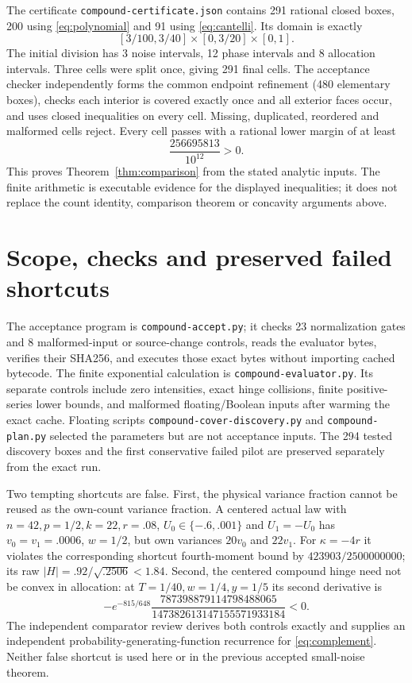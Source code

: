 \documentclass[11pt,a4paper]{article}
\begin{document}
The certificate \texttt{compound-certificate.json} contains 291 rational
closed boxes, 200 using \eqref{eq:polynomial} and 91 using
\eqref{eq:cantelli}. Its domain is exactly
\[
 [3/100,3/40]\times[0,3/20]\times[0,1].
\]
The initial division has 3 noise intervals, 12 phase intervals and
8 allocation intervals. Three cells were split once, giving 291 final
cells. The acceptance checker independently forms the common endpoint
refinement (480 elementary boxes), checks each interior is covered exactly
once and all exterior faces occur, and uses closed inequalities on every
cell. Missing, duplicated, reordered and malformed cells reject.
Every cell passes with a rational lower margin of at least
\[
                    \frac{256695813}{10^{12}}>0.
\]
This proves Theorem~\ref{thm:comparison} from the stated analytic inputs.
The finite arithmetic is executable evidence for the displayed inequalities;
it does not replace the count identity, comparison theorem or concavity
arguments above.

\section{Scope, checks and preserved failed shortcuts}
The acceptance program is \texttt{compound-accept.py}; it checks 23
normalization gates and 8 malformed-input or source-change controls, reads
the evaluator bytes, verifies their SHA256, and executes those exact bytes
without importing cached bytecode. The finite exponential calculation is
\texttt{compound-evaluator.py}. Its separate controls include zero
intensities, exact hinge collisions, finite positive-series lower bounds,
and malformed floating/Boolean inputs after warming the exact cache.
Floating scripts \texttt{compound-cover-discovery.py} and
\texttt{compound-plan.py} selected the parameters but are not acceptance
inputs. The 294 tested discovery boxes and the first conservative failed
pilot are preserved separately from the exact run.

Two tempting shortcuts are false. First, the physical variance fraction
cannot be reused as the own-count variance fraction. A centered actual law
with $n=42,p=1/2,k=22,r=.08$, $U_0\in\{-.6,.001\}$ and $U_1=-U_0$
has $v_0=v_1=.0006$, $w=1/2$, but own variances $20v_0$ and $22v_1$.
For $\kappa=-4r$ it violates the corresponding shortcut fourth-moment
bound by $423903/2500000000$; its raw $|H|=.92/\sqrt{.2506}<1.84$.
Second, the centered compound hinge need not be convex in allocation:
at $T=1/40,w=1/4,y=1/5$ its second derivative is
\[
 -e^{-815/648}
 \frac{787398879114798488065}{147382613147155571933184}<0.
\]
The independent comparator review derives both controls exactly and supplies
an independent probability-generating-function recurrence for
\eqref{eq:complement}. Neither false shortcut is used here or in the
previous accepted small-noise theorem.
\end{document}
